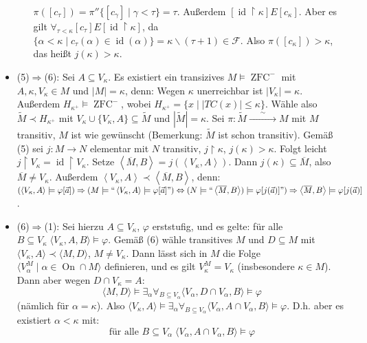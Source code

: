 \documentclass[a4paper,fontsize=11pt]{scrartcl}
\newcommand{\simrightarrow}{\xrightarrow{\phantom{\sim}\sim\phantom{\sim}}}
\newcommand{\ZFC}{\operatorname{ZFC}}
\newcommand{\On}{\operatorname{On}}
\newcommand{\id}{\operatorname{id}}
\begin{document}
\begin{itemize}
\begin{itemize}
                   $\pi([c_\tau])=\pi''\{[c_\gamma]\mid \gamma<\tau\}=\tau$. Außerdem
                   $[\id\upharpoonright\kappa]E[c_\kappa]$. Aber es
                   gilt
                   $\forall_{\tau<\kappa}[c_\tau]E[\id\upharpoonright\kappa]$,
                   da $\{\alpha<\kappa\mid c_\tau(\alpha)\in\id(\alpha)\}=
                   \kappa\backslash(\tau+1)\in\mathcal{F}$. Also
                   $\pi([c_\kappa])>\kappa$, das heißt
                   $j(\kappa)>\kappa$.
      \end{itemize}
    \item (5)$\Rightarrow$(6): Sei $A\subseteq V_\kappa$. Es existiert
      ein transizives $M\models\ZFC^-$ mit $A,\kappa,V_\kappa\in M$
      und $|M|=\kappa$, denn: Wegen $\kappa$ unerreichbar ist
      $|V_\kappa|=\kappa$. Außerdem $H_{\kappa^+}\models\ZFC^-$, wobei
      $H_{\kappa^+}=\{x\mid|TC(x)|\le\kappa\}$. Wähle also
      $\tilde{M}\prec H_{\kappa^+}$ mit
      $V_\kappa\cup\{V_\kappa,A\}\subseteq\tilde{M}$ und
      $|\tilde{M}|=\kappa$. Sei
      $\pi:\tilde{M}\simrightarrow M$ mit $M$ transitiv,
      $M$ ist wie gewünscht (Bemerkung: $\tilde{M}$ ist schon
      transitiv). Gemäß (5) sei $j:M\rightarrow N$ elementar mit $N$
      transitiv, $j\upharpoonright\kappa$, $j(\kappa)>\kappa$. Folgt
      leicht $j\upharpoonright V_\kappa = \id\upharpoonright
      V_\kappa$. Setze
      $\left<\overline{M},B\right>=j(\left<V_\kappa,A\right>)$. Dann
      $j(\kappa)\subseteq\overline{M}$, also $\overline{M}\neq
      V_\kappa$. Außerdem $\left<V_\kappa,
      A\right>\prec\left<\overline{M},B\right>$, denn:
      $(\left<V_\kappa,A\right>\models\varphi[\vec{a}])\Rightarrow
      (M\models\mbox{``}\left<V_\kappa,A\right>\models
      \varphi[\vec{a}]\mbox{\textquotedblright}) \Leftrightarrow
      (N\models\mbox{``}\left<\overline{M},B\right>) \models
      \varphi[j(\vec{a})]\mbox{\textquotedblright}) \Rightarrow
      \left<\overline{M},B\right>\models\varphi[j(\vec{a})]$.
    \item (6)$\Rightarrow$(1): Sei hierzu $A\subseteq V_{\kappa}$, $\varphi$ erststufig, und es gelte:
      für alle $B\subseteq V_{\kappa}\; \langle V_{\kappa}, A, B\rangle\models \varphi$.
      Gemäß (6) wähle transitives $M$ und $D\subseteq M$ mit $\langle V_{\kappa}, A\rangle\prec\langle M,D\rangle$, $M\neq V_{\kappa}$.
      Dann lässt sich in $M$ die Folge $\langle V_{\alpha}^M\mid\alpha\in \On\cap M\rangle$
      definieren, und es gilt $V_{\kappa}^M=V_{\kappa}$ (insbesondere $\kappa\in M$).
      Dann aber wegen $D\cap V_{\kappa} = A$:
      $$\langle M,D\rangle \models \exists_{\alpha}\forall_{B\subseteq V_{\alpha}} 
      \langle V_{\alpha}, D\cap V_{\alpha}, B\rangle\models \varphi$$
      (nämlich für $\alpha =\kappa$). Also
      $\langle V_{\kappa}, A\rangle\models \exists_{\alpha} \forall_{B\subseteq V_{\alpha}} \langle V_{\alpha}, A\cap V_{\alpha}, B\rangle \models \varphi$.
      D.h. aber es existiert $\alpha<\kappa$ mit: $$\mbox{für alle } B\subseteq V_{\alpha}\; \langle V_{\alpha},  A\cap V_{\alpha}, B\rangle\models \varphi$$      
\end{itemize}
\end{document}
